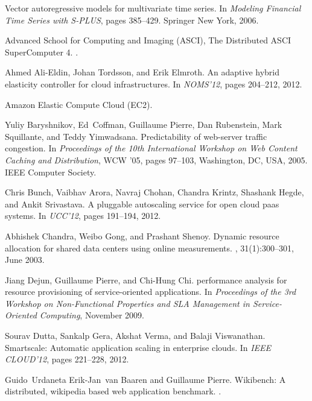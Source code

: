 \documentclass{sig-alternate-10pt}
\begin{document}
\begin{thebibliography}{10}

Vector autoregressive models for multivariate time series.
\newblock In {\em Modeling Financial Time Series with S-PLUS}, pages 385--429.
  Springer New York, 2006.

{ Advanced School for Computing and Imaging (ASCI), The Distributed ASCI
  SuperComputer 4. }.

Ahmed Ali-Eldin, Johan Tordsson, and Erik Elmroth.
\newblock An adaptive hybrid elasticity controller for cloud infrastructures.
\newblock In {\em NOMS'12}, pages 204--212, 2012.

{Amazon Elastic Compute Cloud (EC2)}.

Yuliy Baryshnikov, Ed~Coffman, Guillaume Pierre, Dan Rubenstein, Mark
  Squillante, and Teddy Yimwadsana.
\newblock Predictability of web-server traffic congestion.
\newblock In {\em Proceedings of the 10th International Workshop on Web Content
  Caching and Distribution}, WCW '05, pages 97--103, Washington, DC, USA, 2005.
  IEEE Computer Society.

Chris Bunch, Vaibhav Arora, Navraj Chohan, Chandra Krintz, Shashank Hegde, and
  Ankit Srivastava.
\newblock A pluggable autoscaling service for open cloud paas systems.
\newblock In {\em UCC'12}, pages 191--194, 2012.

Abhishek Chandra, Weibo Gong, and Prashant Shenoy.
\newblock Dynamic resource allocation for shared data centers using online
  measurements.
, 31(1):300--301, June 2003.

Jiang Dejun, Guillaume Pierre, and Chi-Hung Chi.
 performance analysis for resource provisioning of
  service-oriented applications.
\newblock In {\em Proceedings of the 3rd Workshop on Non-Functional Properties
  and SLA Management in Service-Oriented Computing}, November 2009.

Sourav Dutta, Sankalp Gera, Akshat Verma, and Balaji Viswanathan.
\newblock Smartscale: Automatic application scaling in enterprise clouds.
\newblock In {\em IEEE CLOUD'12}, pages 221--228, 2012.

Guido~Urdaneta Erik-Jan~van Baaren and Guillaume Pierre.
\newblock Wikibench: A distributed, wikipedia based web application benchmark.
.


\end{thebibliography}
\end{document}
